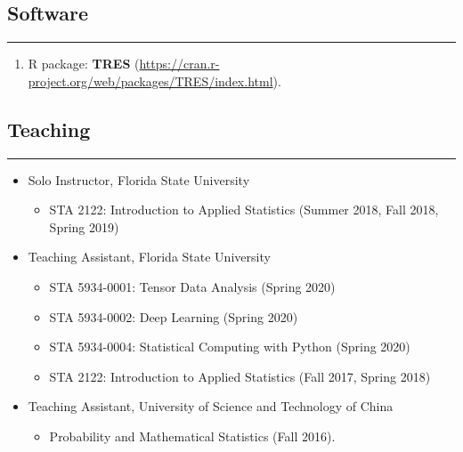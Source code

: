 \documentclass[10pt, oneside]{article}
\begin{document}
\subsection*{Software}
\noindent\rule{\textwidth}{1pt}
\begin{enumerate}[itemsep=0pt]
    \item R package: \textbf{TRES} (\url{https://cran.r-project.org/web/packages/TRES/index.html}).
\end{enumerate}

\subsection*{Teaching}
\noindent\rule{\textwidth}{1pt}
\vspace{-6mm}
\begin{itemize}[itemsep=-1pt]
    \item Solo Instructor, Florida State University
    \begin{itemize}[topsep=-2pt,itemsep=-1pt]
        \item STA 2122: Introduction to Applied Statistics (Summer 2018, Fall 2018, Spring 2019)
    \end{itemize}
    \item Teaching Assistant, Florida State University
    \begin{itemize}[topsep=-2pt,itemsep=-1pt]
        \item STA 5934-0001: Tensor Data Analysis (Spring 2020)
        \item STA 5934-0002: Deep Learning (Spring 2020)
        \item STA 5934-0004: Statistical Computing with Python (Spring 2020)
        \item STA 2122: Introduction to Applied Statistics (Fall 2017, Spring 2018)
    \end{itemize}
    \item Teaching Assistant, University of Science and Technology of China
    \begin{itemize}[topsep=-2pt,itemsep=-1pt]
        \item Probability and Mathematical Statistics (Fall 2016).
    \end{itemize}
\end{itemize}
\end{document}
